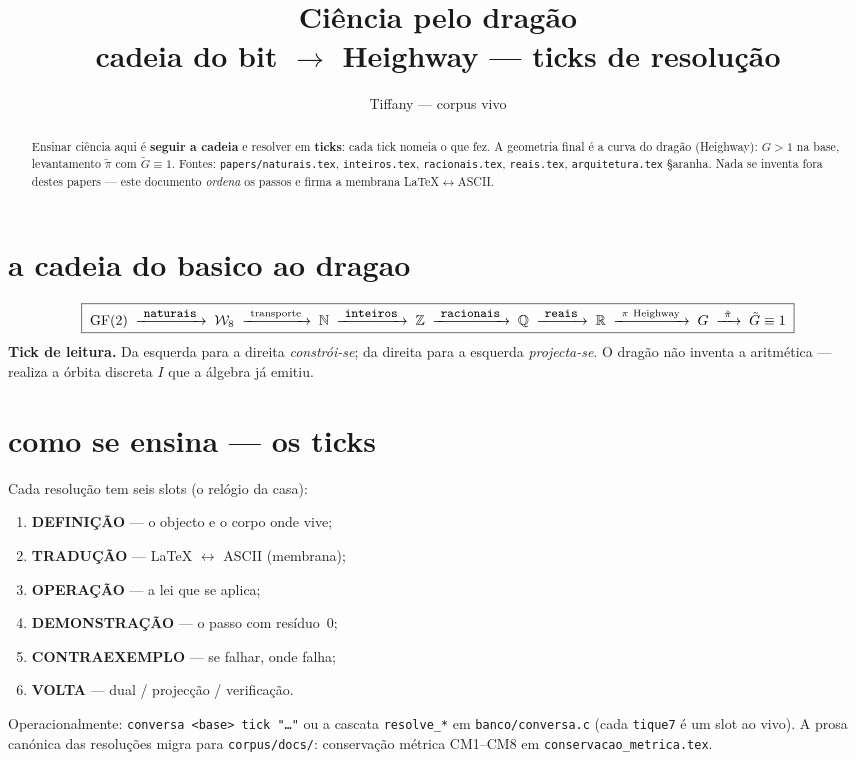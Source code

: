 \documentclass[11pt,a4paper]{article}
\newcommand{\code}[1]{\texttt{\small #1}}
\newcommand{\Word}{\mathcal{W}}
\begin{document}
\title{Ciência pelo dragão\\
\large cadeia do bit $\to$ Heighway --- ticks de resolução}
\author{Tiffany --- corpus vivo}
\date{}
\maketitle

\begin{abstract}
\noindent Ensinar ciência aqui é \textbf{seguir a cadeia} e resolver em
\textbf{ticks}: cada tick nomeia o que fez. A geometria final é a curva do
dragão (Heighway): $G>1$ na base, levantamento $\tilde\pi$ com
$\tilde G\equiv1$. Fontes: \code{papers/naturais.tex},
\code{inteiros.tex}, \code{racionais.tex}, \code{reais.tex},
\code{arquitetura.tex} §aranha. Nada se inventa fora destes papers --- este
documento \emph{ordena} os passos e firma a membrana LaTeX$\leftrightarrow$ASCII.
\end{abstract}

\section{a cadeia do basico ao dragao}\label{sec:cadeia}
\[
\boxed{\;
\mathrm{GF}(2)
\;\xrightarrow{\ \code{naturais}\ }\;
\Word_8
\;\xrightarrow{\ \mathrm{transporte}\ }\;
\mathbb{N}
\;\xrightarrow{\ \code{inteiros}\ }\;
\mathbb{Z}
\;\xrightarrow{\ \code{racionais}\ }\;
\mathbb{Q}
\;\xrightarrow{\ \code{reais}\ }\;
\mathbb{R}
\;\xrightarrow{\ \pi\ \mathrm{Heighway}\ }\;
G
\;\xrightarrow{\ \tilde\pi\ }\;
\tilde G\equiv1
\;}
\]
\noindent\textbf{Tick de leitura.} Da esquerda para a direita \emph{constrói-se};
da direita para a esquerda \emph{projecta-se}. O dragão não inventa a
aritmética --- realiza a órbita discreta $I$ que a álgebra já emitiu.

\section{como se ensina --- os ticks}
Cada resolução tem seis slots (o relógio da casa):
\begin{enumerate}\itemsep2pt
\item \textbf{DEFINIÇÃO} --- o objecto e o corpo onde vive;
\item \textbf{TRADUÇÃO} --- LaTeX $\leftrightarrow$ ASCII (membrana);
\item \textbf{OPERAÇÃO} --- a lei que se aplica;
\item \textbf{DEMONSTRAÇÃO} --- o passo com resíduo~$0$;
\item \textbf{CONTRAEXEMPLO} --- se falhar, onde falha;
\item \textbf{VOLTA} --- dual / projecção / verificação.
\end{enumerate}
Operacionalmente: \code{conversa <base> tick "\ldots"} ou a cascata
\code{resolve\_*} em \code{banco/conversa.c} (cada \texttt{tique7} é um slot
ao vivo). A prosa canónica das resoluções migra para \code{corpus/docs/}:
conservação métrica CM1--CM8 em \code{conservacao\_metrica.tex}.
\end{document}
